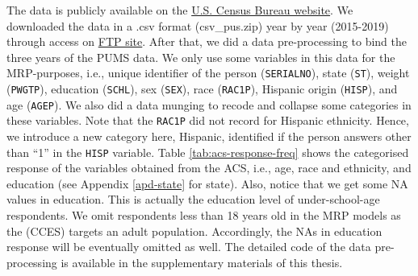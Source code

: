\documentclass{monashthesis}
\begin{document}
The data is publicly available on the \href{https://www.census.gov/programs-surveys/acs/microdata/access.2015.html}{U.S. Census Bureau website}. We downloaded the data in a .csv format (csv\_pus.zip) year by year (2015-2019) through access on \href{https://www2.census.gov/programs-surveys/acs/data/pums/2015/1-Year/}{FTP site}. After that, we did a data pre-processing to bind the three years of the PUMS data. We only use some variables in this data for the MRP-purposes, i.e., unique identifier of the person (\texttt{SERIALNO}), state (\texttt{ST}), weight (\texttt{PWGTP}), education (\texttt{SCHL}), sex (\texttt{SEX}), race (\texttt{RAC1P}), Hispanic origin (\texttt{HISP}), and age (\texttt{AGEP}). We also did a data munging to recode and collapse some categories in these variables. Note that the \texttt{RAC1P} did not record for Hispanic ethnicity. Hence, we introduce a new category here, Hispanic, identified if the person answers other than ``1'' in the \texttt{HISP} variable. Table \ref{tab:acs-response-freq} shows the categorised response of the variables obtained from the ACS, i.e., age, race and ethnicity, and education (see Appendix \ref{apd-state} for state). Also, notice that we get some NA values in education. This is actually the education level of under-school-age respondents. We omit respondents less than 18 years old in the MRP models as the (CCES) targets an adult population. Accordingly, the NAs in education response will be eventually omitted as well. The detailed code of the data pre-processing is available in the supplementary materials of this thesis.
\end{document}
